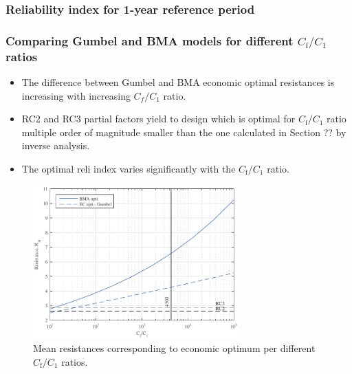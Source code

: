\subsubsection{Reliability index for 1-year reference period}

\subsubsection{Comparing Gumbel and BMA models for different ${C_{\mathrm{f}}}/{C_1}$ ratios}

\begin{itemize}
	\item The difference between Gumbel and BMA economic optimal resistances is increasing with increasing $C_f/C_1$ ratio.
	\item RC2 and RC3 partial factors yield to design which is optimal for ${C_{\mathrm{f}}}/{C_1}$ ratio multiple order of magnitude smaller than the one calculated in Section ?? by inverse analysis.
	\item The optimal reli index varies significantly with the ${C_{\mathrm{f}}}/{C_1}$ ratio.
\end{itemize}


\begin{figure}[htbp!] 
	\centering    
	\includegraphics[width=0.7\textwidth]{comp_gumbel_bma_cf_c1_par.pdf}
	\caption{Mean resistances corresponding to economic optimum per different ${C_{\mathrm{f}}}/{C_1}$ ratios.}
	\label{fig:comp_gumbel_bma_res}
\end{figure}


